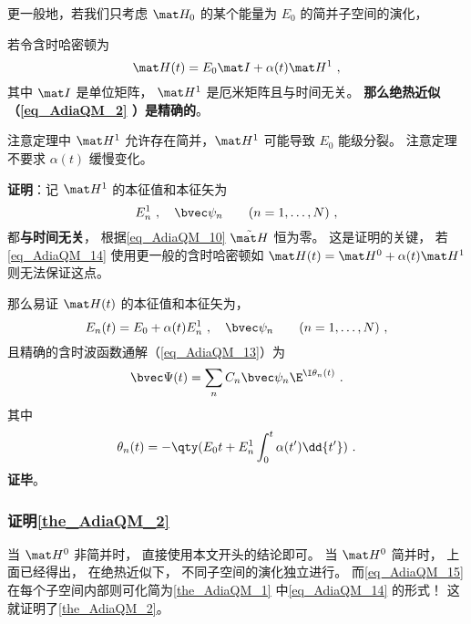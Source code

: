 更一般地，若我们只考虑 $\mat H_0$ 的某个能量为 $E_0$ 的简并子空间的演化，
\begin{theorem}{}\label{the_AdiaQM_1}
若令含时哈密顿为
\begin{equation}\label{eq_AdiaQM_14}
\mat H(t) = E_0\mat I + \alpha(t) \mat H^1~,
\end{equation}
其中 $\mat I$ 是单位矩阵， $\mat H^1$ 是厄米矩阵且与时间无关。 \textbf{那么绝热近似（\autoref{eq_AdiaQM_2} ）是精确的}。
\end{theorem}
注意定理中 $\mat H^1$ 允许存在简并，$\mat H^1$ 可能导致 $E_0$ 能级分裂。 注意定理不要求 $\alpha(t)$ 缓慢变化。

\textbf{证明}：记 $\mat H^1$ 的本征值和本征矢为
\begin{equation}
E_n^1~, \quad \bvec\psi_n \qquad (n=1,\dots,N)~,
\end{equation}
都\textbf{与时间无关}， 根据\autoref{eq_AdiaQM_10} $\tilde{\mat H}$ 恒为零。 这是证明的关键， 若\autoref{eq_AdiaQM_14} 使用更一般的含时哈密顿如 $\mat H(t) = \mat H^0 + \alpha(t) \mat H^1$ 则无法保证这点。

那么易证 $\mat H(t)$ 的本征值和本征矢为，
\begin{equation}
E_n(t) = E_0 + \alpha(t) E_n^1~, \quad \bvec\psi_n \qquad (n=1,\dots,N)~,
\end{equation}
且精确的含时波函数通解（\autoref{eq_AdiaQM_13}）为
\begin{equation}
\bvec \Psi(t) = \sum_n C_n \bvec\psi_n \E^{\I\theta_n(t)}~.
\end{equation}
其中
\begin{equation}
\theta_n(t) = -\qty(E_0 t + E_n^1 \int_0^t\alpha(t')\dd{t'})~.
\end{equation}
\textbf{证毕}。

\subsubsection{证明\autoref{the_AdiaQM_2} }
当 $\mat H^0$ 非简并时， 直接使用本文开头的结论即可。 当 $\mat H^0$ 简并时， 上面已经得出， 在绝热近似下， 不同子空间的演化独立进行。 而\autoref{eq_AdiaQM_15} 在每个子空间内部则可化简为\autoref{the_AdiaQM_1} 中\autoref{eq_AdiaQM_14} 的形式！ 这就证明了\autoref{the_AdiaQM_2}。
